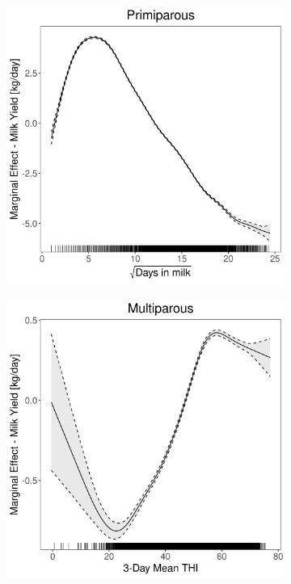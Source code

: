 \begin{figure}[H]
\begin{subfigure}[b]{0.45\textwidth}
    \end{subfigure}
    \hspace{0.05\textwidth} %
    \begin{subfigure}[b]{0.45\textwidth}
        \centering
        \includegraphics[width=\textwidth]{thesis/figures/models/milk/full/je_milk_full/je_milk_full_marginal_dim_milk_primi.png}
    \end{subfigure}
    \begin{subfigure}[b]{0.45\textwidth}
        \centering
        \includegraphics[width=\textwidth]{thesis/figures/models/milk/full/je_milk_full/je_milk_full_marginal_thi_milk_multi.png}

\end{subfigure}
\end{figure}

